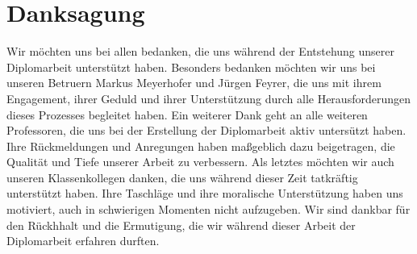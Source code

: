 \chapter*{Danksagung} 

Wir möchten uns bei allen bedanken, die uns während der Entstehung unserer Diplomarbeit unterstützt haben. Besonders bedanken möchten wir uns bei unseren Betruern Markus Meyerhofer und Jürgen Feyrer, die uns mit ihrem Engagement, ihrer Geduld und ihrer Unterstützung durch alle Herausforderungen dieses Prozesses begleitet haben. Ein weiterer Dank geht an alle weiteren Professoren, die uns bei der Erstellung der Diplomarbeit aktiv untersützt haben. Ihre Rückmeldungen und Anregungen haben maßgeblich dazu beigetragen, die Qualität und Tiefe unserer Arbeit zu verbessern. Als letztes möchten wir auch unseren Klassenkollegen danken, die uns während dieser Zeit tatkräftig unterstützt haben. Ihre Taschläge und ihre moralische Unterstützung haben uns motiviert, auch in schwierigen Momenten nicht aufzugeben. Wir sind dankbar für den Rückhhalt und die Ermutigung, die wir während dieser Arbeit der Diplomarbeit erfahren durften.